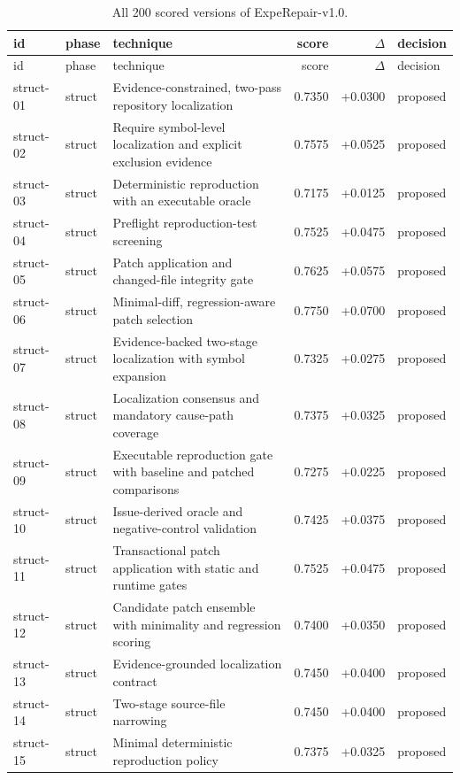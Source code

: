 \begin{center}\scriptsize\begin{longtable}{llp{5.2cm}rrl}
\caption{All 200 scored versions of ExpeRepair-v1.0.}\\
\toprule id & phase & technique & score & $\Delta$ & decision \\ \midrule \endfirsthead
\toprule id & phase & technique & score & $\Delta$ & decision \\ \midrule \endhead
struct-01 & struct & Evidence-constrained, two-pass repository localization & 0.7350 & +0.0300 & proposed \\
struct-02 & struct & Require symbol-level localization and explicit exclusion evidence & 0.7575 & +0.0525 & proposed \\
struct-03 & struct & Deterministic reproduction with an executable oracle & 0.7175 & +0.0125 & proposed \\
struct-04 & struct & Preflight reproduction-test screening & 0.7525 & +0.0475 & proposed \\
struct-05 & struct & Patch application and changed-file integrity gate & 0.7625 & +0.0575 & proposed \\
struct-06 & struct & Minimal-diff, regression-aware patch selection & 0.7750 & +0.0700 & proposed \\
struct-07 & struct & Evidence-backed two-stage localization with symbol expansion & 0.7325 & +0.0275 & proposed \\
struct-08 & struct & Localization consensus and mandatory cause-path coverage & 0.7375 & +0.0325 & proposed \\
struct-09 & struct & Executable reproduction gate with baseline and patched comparisons & 0.7275 & +0.0225 & proposed \\
struct-10 & struct & Issue-derived oracle and negative-control validation & 0.7425 & +0.0375 & proposed \\
struct-11 & struct & Transactional patch application with static and runtime gates & 0.7525 & +0.0475 & proposed \\
struct-12 & struct & Candidate patch ensemble with minimality and regression scoring & 0.7400 & +0.0350 & proposed \\
struct-13 & struct & Evidence-grounded localization contract & 0.7450 & +0.0400 & proposed \\
struct-14 & struct & Two-stage source-file narrowing & 0.7450 & +0.0400 & proposed \\
struct-15 & struct & Minimal deterministic reproduction policy & 0.7375 & +0.0325 & proposed \\

\end{longtable}
\end{center}
